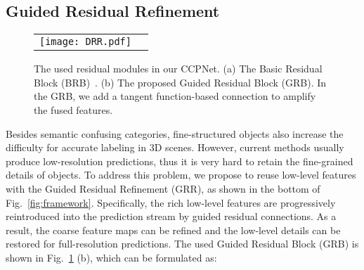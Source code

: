 \documentclass[10pt,twocolumn,letterpaper]{article}
\begin{document}
\subsection{Guided Residual Refinement}
\begin{figure}
\centering
\resizebox{0.48\textwidth}{!}
{
\begin{tabular}{@{}c@{}c@{}}
\texttt{[image: DRR.pdf]} \\
\end{tabular}
}
\caption{The used residual modules in our CCPNet. (a) The Basic Residual Block (BRB)~\cite{he2016deep}. (b) The proposed Guided Residual Block (GRB). In the GRB, we add a tangent function-based connection to amplify the fused features.}
\vspace{-4mm}
\label{fig:grb}
\end{figure}
Besides semantic confusing categories, fine-structured objects also increase the difficulty for
accurate labeling in 3D scenes.
However, current methods usually produce low-resolution predictions, thus it is very hard to retain the fine-grained details of objects.
To address this problem, we propose to reuse low-level features with the Guided Residual Refinement (GRR), as shown in the bottom of Fig.~\ref{fig:framework}.
Specifically, the rich low-level features are progressively reintroduced into the prediction stream by guided residual connections.
As a result, the coarse feature maps can be refined and the low-level details can be restored for full-resolution predictions.
The used Guided Residual Block (GRB) is shown in Fig.~\ref{fig:grb} (b), which can be formulated as:
\end{document}
